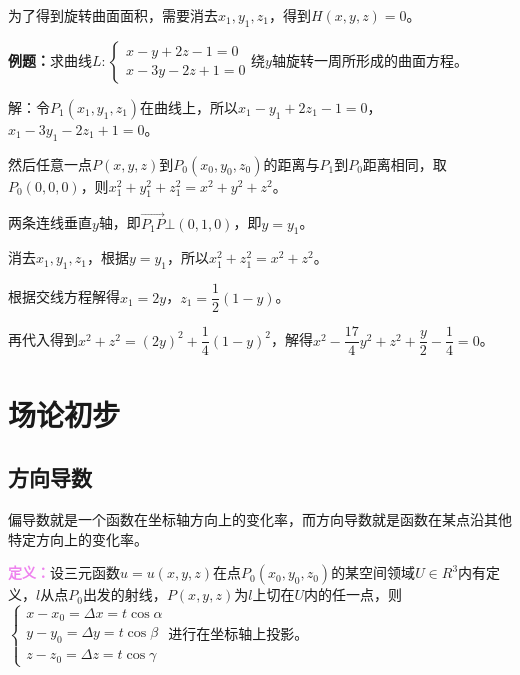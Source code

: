 \documentclass[UTF8, 12pt]{ctexart}
\begin{document}
        为了得到旋转曲面面积，需要消去$x_1,y_1,z_1$，得到$H(x,y,z)=0$。

        \textbf{例题：}求曲线$L:\left\{\begin{array}{l}
                                          x-y+2z-1=0 \\
                                          x-3y-2z+1=0
        \end{array}\right.$绕$y$轴旋转一周所形成的曲面方程。

        解：令$P_1(x_1,y_1,z_1)$在曲线上，所以$x_1-y_1+2z_1-1=0$，$x_1-3y_1-2z_1+1=0$。

        然后任意一点$P(x,y,z)$到$P_0(x_0,y_0,z_0)$的距离与$P_1$到$P_0$距离相同，取$P_0(0,0,0)$，则$x_1^2+y_1^2+z_1^2=x^2+y^2+z^2$。

        两条连线垂直$y$轴，即$\overrightarrow{P_1P}\bot(0,1,0)$，即$y=y_1$。

        消去$x_1,y_1,z_1$，根据$y=y_1$，所以$x_1^2+z_1^2=x^2+z^2$。

        根据交线方程解得$x_1=2y$，$z_1=\dfrac{1}{2}(1-y)$。

        再代入得到$x^2+z^2=(2y)^2+\dfrac{1}{4}(1-y)^2$，解得$x^2-\dfrac{17}{4}y^2+z^2+\dfrac{y}{2}-\dfrac{1}{4}=0$。

        \section{场论初步}

        \subsection{方向导数}

        偏导数就是一个函数在坐标轴方向上的变化率，而方向导数就是函数在某点沿其他特定方向上的变化率。

        \textcolor{violet}{\textbf{定义：}}设三元函数$u=u(x,y,z)$在点$P_0(x_0,y_0,z_0)$的某空间领域$U\in R^3$内有定义，$l$从点$P_0$出发的射线，$P(x,y,z)$为$l$上切在$U$内的任一点，则$\left\{\begin{array}{l}
                                                                                                                                                                                             x-x_0=\Delta x=t\cos\alpha \\
                                                                                                                                                                                             y-y_0=\Delta y=t\cos\beta \\
                                                                                                                                                                                             z-z_0=\Delta z=t\cos\gamma
        \end{array}\right.$进行在坐标轴上投影。
\end{document}
